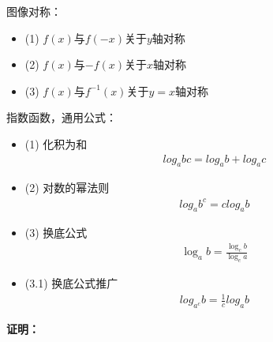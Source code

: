 \documentclass{article}
\begin{document}
\begin{zremark}
  图像对称：
  \begin{itemize}
    \item (1) $f(x)$与$f(-x)$关于$y$轴对称
    \item (2) $f(x)$与$-f(x)$关于$x$轴对称
    \item (3) $f(x)$与$f^{-1}(x)$关于$y = x$轴对称
  \end{itemize}
\end{zremark}

\begin{zremark}
  指数函数，通用公式：
  \begin{itemize}
    \item (1) 化积为和
          \begin{align*}
            log_a bc = log_a b + log_a c
          \end{align*}

    \item (2) 对数的幂法则
          \begin{align*}
            log_a b^c = c log_a b
          \end{align*}

    \item (3) 换底公式
          \begin{align*}
            \log_a b = \frac{\log_c b}{\log_c a}
          \end{align*}

    \item (3.1) 换底公式推广
          \begin{align*}
            log_{a^c} b = \frac{1}{c} log_a b
          \end{align*}
  \end{itemize}
\end{zremark}
\textbf{证明：}
\end{document}
